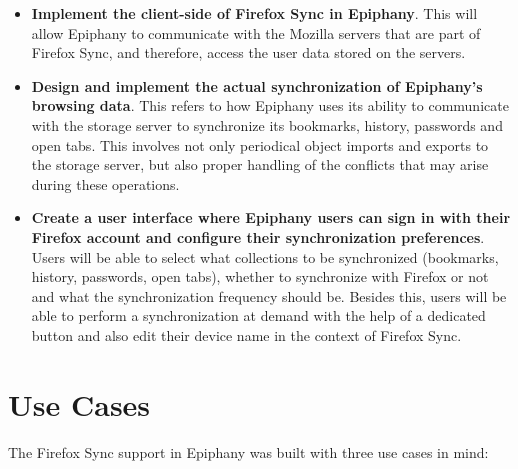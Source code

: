 \begin{itemize}
  \item \textbf{Implement the client-side of Firefox Sync in Epiphany}. This will allow Epiphany to communicate with the Mozilla servers that are part of Firefox Sync, and therefore, access the user data stored on the servers.

  \item \textbf{Design and implement the actual synchronization of Epiphany's browsing data}. This refers to how Epiphany uses its ability to communicate with the storage server to synchronize its bookmarks, history, passwords and open tabs. This involves not only periodical object imports and exports to the storage server, but also proper handling of the conflicts that may arise during these operations.

  \item \textbf{Create a user interface where Epiphany users can sign in with their Firefox account and configure their synchronization preferences}. Users will be able to select what collections to be synchronized (bookmarks, history, passwords, open tabs), whether to synchronize with Firefox or not and what the synchronization frequency should be. Besides this, users will be able to perform a synchronization at demand with the help of a dedicated button and also edit their device name in the context of Firefox Sync.
\end{itemize}

\section{Use Cases}
\label{sec:use-cases}

The Firefox Sync support in Epiphany was built with three use cases in mind:

